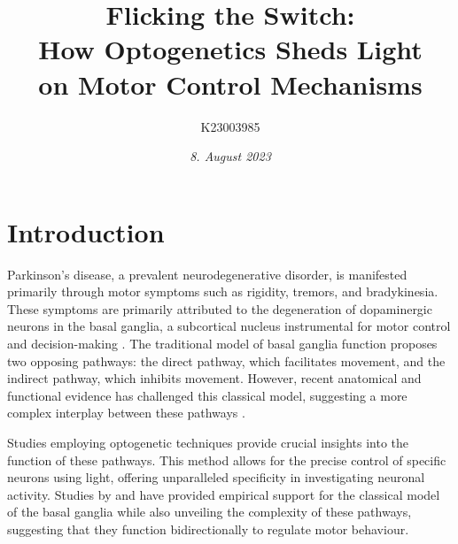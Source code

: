 \documentclass[10pt]{article}
\title{\textbf{Flicking the Switch: } \\ How Optogenetics Sheds Light \\ on Motor Control Mechanisms}
\author[ ]{K23003985}
\affil[ ]{\textbf{King’s College London}}
\affil[ ]{\href{mailto:K23003985@kcl.ac.uk}{K23003985@kcl.ac.uk}}
\date{\textit{8. August 2023}}
\begin{document}

\maketitle

\begin{sloppypar} %





  \doublespacing


  \section{Introduction}
  \label{sec:introduction}

  Parkinson’s disease, a prevalent neurodegenerative disorder, is manifested primarily through motor symptoms such as rigidity, tremors, and bradykinesia. These symptoms are primarily attributed to the degeneration of dopaminergic neurons in the basal ganglia, a subcortical nucleus instrumental for motor control and decision-making \citep{kravitz_regulation_2010}. The traditional model of basal ganglia function proposes two opposing pathways: the direct pathway, which facilitates movement, and the indirect pathway, which inhibits movement. However, recent anatomical and functional evidence has challenged this classical model, suggesting a more complex interplay between these pathways \citep{dunovan_believer-skeptic_2016}.

  Studies employing optogenetic techniques \citep{kravitz_regulation_2010, cui_concurrent_2013} provide crucial insights into the function of these pathways. This method allows for the precise control of specific neurons using light, offering unparalleled specificity in investigating neuronal activity. Studies by \cite{kravitz_regulation_2010} and \cite{cui_concurrent_2013} have provided empirical support for the classical model of the basal ganglia while also unveiling the complexity of these pathways, suggesting that they function bidirectionally \citep{yttri_opponent_2016} to regulate motor behaviour.


\end{sloppypar}
\end{document}
